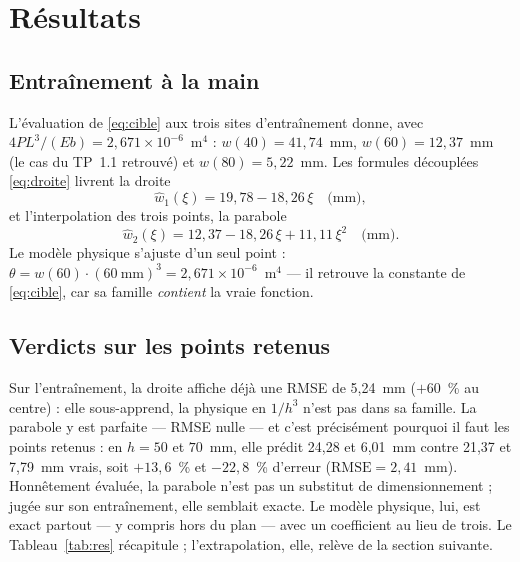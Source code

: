 \documentclass[10pt,journal]{IEEEtran}
\begin{document}
\section{Résultats}
\subsection{Entraînement à la main}
L'évaluation de \eqref{eq:cible} aux trois sites d'entraînement donne, avec $4PL^3/(Eb) = 2{,}671\times10^{-6}$~m$^4$ : $w(40) = 41{,}74$~mm, $w(60) = 12{,}37$~mm (le cas du TP~1.1 retrouvé) et $w(80) = 5{,}22$~mm. Les formules découplées \eqref{eq:droite} livrent la droite
\begin{equation}
\hat w_1(\xi) = 19{,}78 - 18{,}26\,\xi \quad \text{(mm)},
\label{eq:fit1}
\end{equation}
et l'interpolation des trois points, la parabole
\begin{equation}
\hat w_2(\xi) = 12{,}37 - 18{,}26\,\xi + 11{,}11\,\xi^2 \quad \text{(mm)}.
\label{eq:fit2}
\end{equation}
Le modèle physique s'ajuste d'un seul point : $\theta = w(60)\cdot(60~\text{mm})^3 = 2{,}671\times10^{-6}$~m$^4$ --- il retrouve la constante de \eqref{eq:cible}, car sa famille \emph{contient} la vraie fonction.

\subsection{Verdicts sur les points retenus}
Sur l'entraînement, la droite affiche déjà une RMSE de 5,24~mm ($+60$~\% au centre) : elle sous-apprend, la physique en $1/h^3$ n'est pas dans sa famille. La parabole y est parfaite --- RMSE nulle --- et c'est précisément pourquoi il faut les points retenus : en $h=50$ et $70$~mm, elle prédit 24,28 et 6,01~mm contre 21,37 et 7,79~mm vrais, soit $+13{,}6$~\% et $-22{,}8$~\% d'erreur ($\mathrm{RMSE}=2{,}41$~mm). Honnêtement évaluée, la parabole n'est pas un substitut de dimensionnement ; jugée sur son entraînement, elle semblait exacte. Le modèle physique, lui, est exact partout --- y compris hors du plan --- avec un coefficient au lieu de trois. Le Tableau~\ref{tab:res} récapitule ; l'extrapolation, elle, relève de la section suivante.
\end{document}
